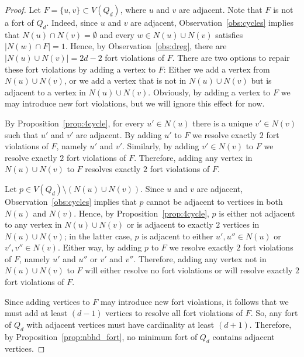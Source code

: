 \documentclass[twoside, 12pt]{article}
\theoremstyle{definition}
\newcommand\abs[1]{\left|#1\right|}
\begin{document}
\begin{proof}
Let $F=\{u,v\}\subset V(Q_{d})$, where $u$ and $v$ are adjacent.
Note that $F$ is not a fort of $Q_{d}$.
Indeed, since $u$ and $v$ are adjacent, Observation~\ref{obs:cycles} implies that $N(u)\cap N(v)=\emptyset$ and every $w\in N(u)\cup N(v)$ satisfies $\abs{N(w)\cap F}=1$. 
Hence, by Observation~\ref{obs:dreg}, there are $\abs{N(u)\cup N(v)}=2d-2$ fort violations of $F$. 
There are two options to repair these fort violations by adding a vertex to $F$: Either we add a vertex from $N(u)\cup N(v)$, or we add a vertex that is not in $N(u)\cup N(v)$ but is adjacent to a vertex in $N(u)\cup N(v)$.
Obviously, by adding a vertex to $F$ we may introduce new fort violations, but we will ignore this effect for now. 

By Proposition~\ref{prop:4cycle}, for every $u'\in N(u)$ there is a unique $v'\in N(v)$ such that $u'$ and $v'$ are adjacent. 
By adding $u'$ to $F$ we resolve exactly $2$ fort violations of $F$, namely $u'$ and $v'$.
Similarly, by adding $v'\in N(v)$ to $F$ we resolve exactly $2$ fort violations of $F$. 
Therefore, adding any vertex in $N(u)\cup N(v)$ to $F$ resolves exactly $2$ fort violations of $F$.

Let $p\in V(Q_{d})\setminus\left(N(u)\cup N(v)\right)$.
Since $u$ and $v$ are adjacent, Observation~\ref{obs:cycles} implies that $p$ cannot be adjacent to vertices in both $N(u)$ and $N(v)$.
Hence, by Proposition~\ref{prop:4cycle}, $p$ is either not adjacent to any vertex in $N(u)\cup N(v)$ or is adjacent to exactly  $2$ vertices in $N(u)\cup N(v)$; in the latter case, $p$ is adjacent to either $u',u''\in N(u)$ or $v',v''\in N(v)$. 
Either way, by adding $p$ to $F$ we resolve exactly $2$ fort violations of $F$, namely $u'$ and $u''$ or $v'$ and $v''$. 
Therefore, adding any vertex not in $N(u)\cup N(v)$ to $F$ will either resolve no fort violations or will resolve exactly $2$ fort violations of $F$. 

Since adding vertices to $F$ may introduce new fort violations, it follows that we must add at least $(d-1)$ vertices to resolve all fort violations of $F$.
So, any fort of $Q_{d}$ with adjacent vertices must have cardinality at least $(d+1)$. 
Therefore, by Proposition~\ref{prop:nbhd_fort}, no minimum fort of $Q_{d}$ contains adjacent vertices. 
\end{proof}
\end{document}
